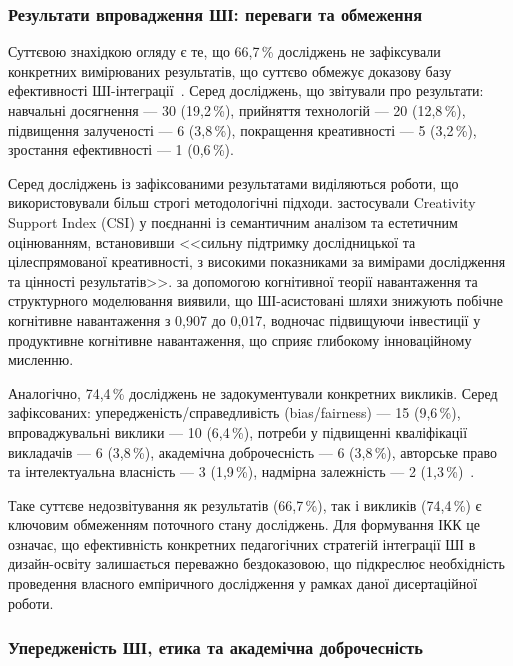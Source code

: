 \subsubsection{Результати впровадження ШІ: переваги та обмеження}\label{sssec:1.2.8}

Суттєвою знахідкою огляду є те, що 66,7\,\% досліджень не зафіксували конкретних вимірюваних результатів, що суттєво обмежує доказову базу ефективності ШІ-інтеграції~\cite{Musiienko2026ScopingReview}. Серед досліджень, що звітували про результати: навчальні досягнення --- 30 (19,2\,\%), прийняття технологій --- 20 (12,8\,\%), підвищення залученості --- 6 (3,8\,\%), покращення креативності --- 5 (3,2\,\%), зростання ефективності --- 1 (0,6\,\%).

Серед досліджень із зафіксованими результатами виділяються роботи, що використовували більш строгі методологічні підходи. \citet{MedelVera2025} застосували Creativity Support Index (CSI) у поєднанні із семантичним аналізом та естетичним оцінюванням, встановивши <<сильну підтримку дослідницької та цілеспрямованої креативності, з високими показниками за вимірами дослідження та цінності результатів>>. \citet{Dong2025} за допомогою когнітивної теорії навантаження та структурного моделювання виявили, що ШІ-асистовані шляхи знижують побічне когнітивне навантаження з 0,907 до 0,017, водночас підвищуючи інвестиції у продуктивне когнітивне навантаження, що сприяє глибокому інноваційному мисленню.

Аналогічно, 74,4\,\% досліджень не задокументували конкретних викликів. Серед зафіксованих: упередженість/справедливість (bias/fairness) --- 15 (9,6\,\%), впроваджувальні виклики --- 10 (6,4\,\%), потреби у підвищенні кваліфікації викладачів --- 6 (3,8\,\%), академічна доброчесність --- 6 (3,8\,\%), авторське право та інтелектуальна власність --- 3 (1,9\,\%), надмірна залежність --- 2 (1,3\,\%)~\cite{Musiienko2026ScopingReview}.

Таке суттєве недозвітування як результатів (66,7\,\%), так і викликів (74,4\,\%) є ключовим обмеженням поточного стану досліджень. Для формування ІКК це означає, що ефективність конкретних педагогічних стратегій інтеграції ШІ в дизайн-освіту залишається переважно бездоказовою, що підкреслює необхідність проведення власного емпіричного дослідження у рамках даної дисертаційної роботи.

\subsubsection{Упередженість ШІ, етика та академічна доброчесність}\label{sssec:1.2.9}

